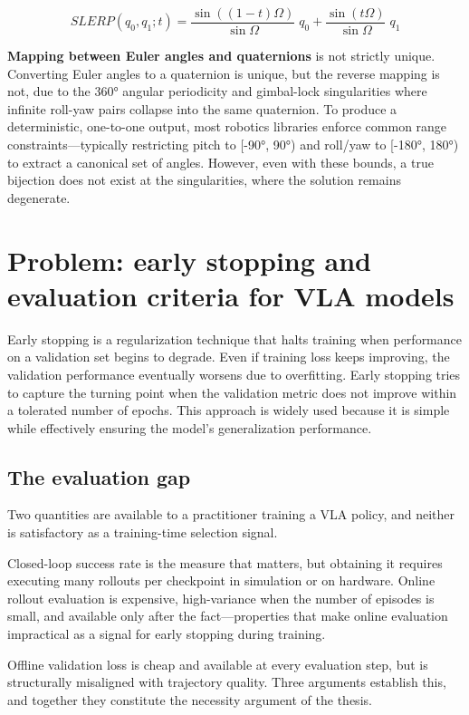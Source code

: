 \documentclass[english,12pt,a4paper,pdftex,elec,utf8]{aaltothesis}
\begin{document}
$$S L E R P(q_{0},q_{1};t)={\frac{\sin((1-t)\Omega)}{\sin\Omega}}\;q_{0}+{\frac{\sin(t\Omega)}{\sin\Omega}}\;q_{1}$$

\textbf{Mapping between Euler angles and quaternions} is not strictly unique. Converting Euler angles to a quaternion is unique, but the reverse mapping is not, due to the 360° angular periodicity and gimbal-lock singularities where infinite roll-yaw pairs collapse into the same quaternion. To produce a deterministic, one-to-one output, most robotics libraries enforce common range constraints—typically restricting pitch to [-90°, 90°) and roll/yaw to [-180°, 180°) to extract a canonical set of angles. However, even with these bounds, a true bijection does not exist at the singularities, where the solution remains degenerate.



\clearpage

\section{Problem: early stopping and evaluation criteria for VLA models}
\label{sec:eval}

Early stopping is a regularization technique that halts training when performance on a validation set begins to degrade. Even if training loss keeps improving, the validation performance eventually worsens due to overfitting. Early stopping tries to capture the turning point when the validation metric does not improve within a tolerated number of epochs. This approach is widely used because it is simple while effectively ensuring the model's generalization performance. 

\subsection{The evaluation gap}
\label{subsec:eval-gap}

Two quantities are available to a practitioner training a VLA policy, and neither is satisfactory as a training-time selection signal.

Closed-loop success rate is the measure that matters, but obtaining it requires executing many rollouts per checkpoint in simulation or on hardware. Online rollout evaluation is expensive, high-variance when the number of episodes is small, and available only after the fact---properties that make online evaluation impractical as a signal for early
stopping during training.

Offline validation loss is cheap and available at every evaluation step, but is structurally misaligned with trajectory quality. Three arguments establish this, and together they constitute the necessity argument of the thesis.
\end{document}
